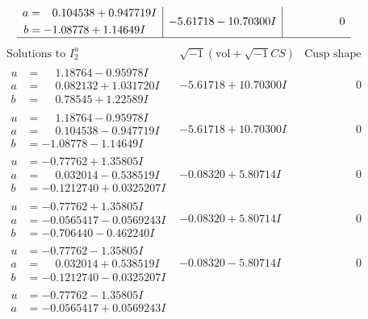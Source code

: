 \documentclass[1p]{elsarticle_modified}
\theoremstyle{definition}
\newcommand{\I}{\sqrt{-1}}
\begin{document}
$$\begin{array}{c|c|c}
\begin{aligned}
a &= \phantom{-}0.104538 + 0.947719 I \\
b &= -1.08778 + 1.14649 I\end{aligned}
 & -5.61718 - 10.70300 I & \phantom{-0.000000 } 0\\
 \hline 
 \end{array}$$\newpage$$\begin{array}{c|c|c}  
\text{Solutions to }I^u_{2}& \I (\text{vol} + \sqrt{-1}CS) & \text{Cusp shape}\\
 \hline 
\begin{aligned}
u &= \phantom{-}1.18764 - 0.95978 I \\
a &= \phantom{-}0.082132 + 1.031720 I \\
b &= \phantom{-}0.78545 + 1.22589 I\end{aligned}
 & -5.61718 + 10.70300 I & \phantom{-0.000000 } 0 \\ \hline\begin{aligned}
u &= \phantom{-}1.18764 - 0.95978 I \\
a &= \phantom{-}0.104538 - 0.947719 I \\
b &= -1.08778 - 1.14649 I\end{aligned}
 & -5.61718 + 10.70300 I & \phantom{-0.000000 } 0 \\ \hline\begin{aligned}
u &= -0.77762 + 1.35805 I \\
a &= \phantom{-}0.032014 - 0.538519 I \\
b &= -0.1212740 + 0.0325207 I\end{aligned}
 & -0.08320 + 5.80714 I & \phantom{-0.000000 } 0 \\ \hline\begin{aligned}
u &= -0.77762 + 1.35805 I \\
a &= -0.0565417 - 0.0569243 I \\
b &= -0.706440 - 0.462240 I\end{aligned}
 & -0.08320 + 5.80714 I & \phantom{-0.000000 } 0 \\ \hline\begin{aligned}
u &= -0.77762 - 1.35805 I \\
a &= \phantom{-}0.032014 + 0.538519 I \\
b &= -0.1212740 - 0.0325207 I\end{aligned}
 & -0.08320 - 5.80714 I & \phantom{-0.000000 } 0 \\ \hline\begin{aligned}
u &= -0.77762 - 1.35805 I \\
a &= -0.0565417 + 0.0569243 I \\

\end{aligned}
\end{array}$$
\end{document}
